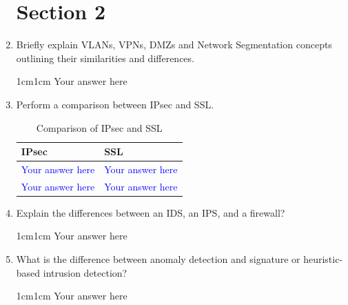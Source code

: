 \documentclass[11pt,letterpaper]{article}
\newenvironment{answer}{\em \color{blue} \begin{adjustwidth}{1cm}{1cm}}{\end{adjustwidth}}
\begin{document}
\begin{enumerate}
		\section*{Section 2}
		
		
		\item Briefly explain VLANs, VPNs, DMZs and Network Segmentation concepts outlining their similarities and differences.
		
		\begin{answer}
			Your answer here
		\end{answer}
		
		\item Perform a comparison between IPsec and SSL.
		
		\begin{table}[htbp]
			\caption{Comparison of IPsec and SSL}
			\begin{tabularx}{\columnwidth}{|X|X|}
				\hline
				\textbf{IPsec} & \textbf{SSL}\\
				\hline
				\textcolor{blue}{Your answer here} & 
				\textcolor{blue}{Your answer here} \\ 
				\hline 
				\textcolor{blue}{Your answer here} & 
				\textcolor{blue}{Your answer here} \\ 
				\hline 
				
				
			\end{tabularx}
		\end{table}
		
		\item Explain the differences between an IDS, an IPS, and a firewall?
		
		\begin{answer}
			Your answer here
		\end{answer}
		
		\item What is the difference between anomaly detection and signature or heuristic-based intrusion detection?
		
		\begin{answer}
			Your answer here
		\end{answer}
		
	\end{enumerate}
	
\end{document}
